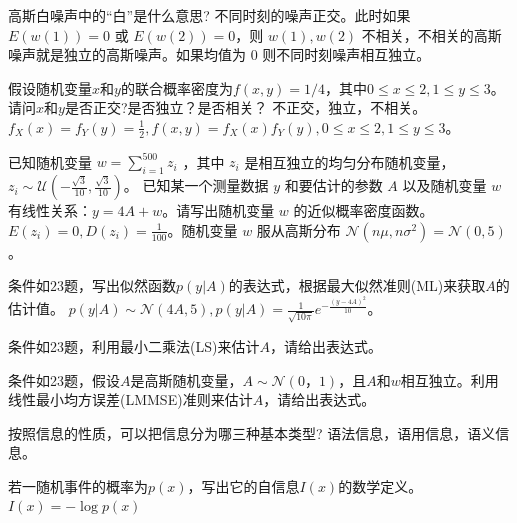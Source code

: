 \begin{problem}
	高斯白噪声中的“白”是什么意思?
	\solution 不同时刻的噪声正交。此时如果 $E(w(1)) = 0$ 或 $E(w(2)) = 0$，则 $w(1),w(2)$ 不相关，不相关的高斯噪声就是独立的高斯噪声。如果均值为 0 则不同时刻噪声相互独立。
\end{problem}

\begin{problem}
	假设随机变量$x$和$y$的联合概率密度为$f(x,y)=1/4$，其中$0\le x\le 2,1\le y\le 3$。请问$x$和$y$是否正交?是否独立？是否相关？
	\solution 不正交，独立，不相关。$f_X(x) = f_Y(y) = \frac{1}{2},f(x, y) = f_X(x)f_Y(y),0 \le x \le 2, 1 \le y \le 3$。
\end{problem}

\begin{problem}
	已知随机变量 $w=\sum_{i=1}^{500}z_i$ ，其中 $z_i$ 是相互独立的均匀分布随机变量，$z_i\sim\mathcal{U}(-\frac{\sqrt{3}}{10},\frac{\sqrt{3}}{10})$。 已知某一个测量数据 $y$ 和要估计的参数 $A$ 以及随机变量 $w$ 有线性关系：$y=4A+w$。请写出随机变量 $w$ 的近似概率密度函数。
	\solution $E(z_i) = 0, D(z_i) = \frac{1}{100}$。随机变量 $w$ 服从高斯分布 $\mathcal{N}(n\mu, n\sigma^2) = \mathcal{N}(0, 5)$。
\end{problem}

\begin{problem}
	条件如$23$题，写出似然函数$p(y|A)$的表达式，根据最大似然准则(ML)来获取$A$的估计值。
	\solution $p(y|A) \sim \mathcal{N}(4A, 5), p(y|A) = \frac{1}{\sqrt{10\pi}}e^{-\frac{(y - 4A)^2}{10}}$。
\end{problem}

\begin{problem}[\todo]
	条件如23题，利用最小二乘法(LS)来估计$A$，请给出表达式。
	\solution 
\end{problem}

\begin{problem}[\todo]
	条件如23题，假设$A$是高斯随机变量，$A\sim\mathcal{N}(0，1)$，且$A$和$w$相互独立。利用线性最小均方误差(LMMSE)准则来估计$A$，请给出表达式。
	\solution 
\end{problem}

\begin{problem}
	按照信息的性质，可以把信息分为哪三种基本类型?
	\solution 语法信息，语用信息，语义信息。
\end{problem}

\begin{problem}
	若一随机事件的概率为$p(x)$，写出它的自信息$I(x)$的数学定义。
	\solution $I(x) = -\log p(x)$ 
\end{problem}

